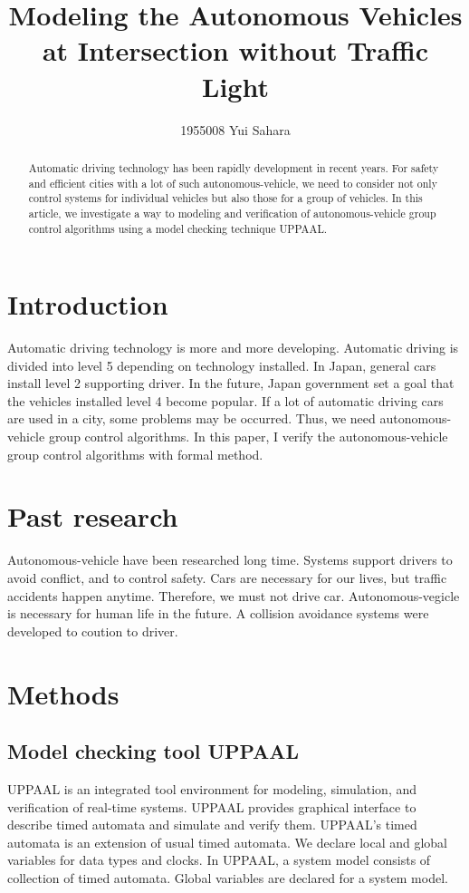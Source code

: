 \documentclass[]{article}
\title{Modeling the Autonomous Vehicles at Intersection without Traffic Light}
\author{1955008	Yui Sahara}
\date{}
\begin{document}
\maketitle
\begin{abstract}
	Automatic driving technology has been rapidly development in recent years.  For safety and efficient cities with a lot of such autonomous-vehicle, we need to consider not only control systems for individual vehicles but also those for a group of vehicles.  In this article, we investigate a way to modeling and verification of autonomous-vehicle group control algorithms using a model checking technique UPPAAL.
\end{abstract}

\section{Introduction}
	  Automatic driving technology is more and more developing.  Automatic driving is divided into level  5 depending on technology installed.  In Japan, general cars install level 2 supporting driver.  In the future,  Japan government set a goal that the vehicles installed level 4 become popular.  If a lot of automatic driving cars are used in a city, some problems may be occurred.  Thus, we need autonomous-vehicle group control algorithms.  In this paper, I verify the autonomous-vehicle group control algorithms with formal method.
\section{Past research}
	Autonomous-vehicle have been researched long time.  Systems support drivers to avoid conflict, and to control safety.  Cars are necessary for our lives, but traffic accidents happen anytime.  Therefore, we must not drive car.  Autonomous-vegicle is necessary for human life in the future.  A collision avoidance systems were developed to coution to driver.   
\section{Methods}
	\subsection{Model checking tool UPPAAL}
		UPPAAL is an integrated tool environment for modeling, simulation, and verification of real-time systems.  UPPAAL provides graphical interface to describe timed automata and simulate and verify them. UPPAAL's timed automata is an extension of usual timed automata.  We declare local and global variables for data types and clocks. In UPPAAL, a system model consists of collection of timed automata.  Global variables are declared for a system model.  
\end{document}
